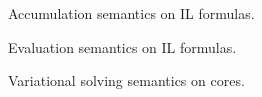 \documentclass[sigconf]{acmart}
\begin{document}
\begin{figure}
  
  \caption{Accumulation semantics on IL formulas.}
  \label{impl:accum}
\end{figure}

\begin{figure}
  
  \caption{Evaluation semantics on IL formulas.}
  \label{impl:accum}
\end{figure}

\begin{figure}
  
  \caption{Variational solving semantics on cores.}
  \label{impl:choice-eval}
\end{figure}
\end{document}
